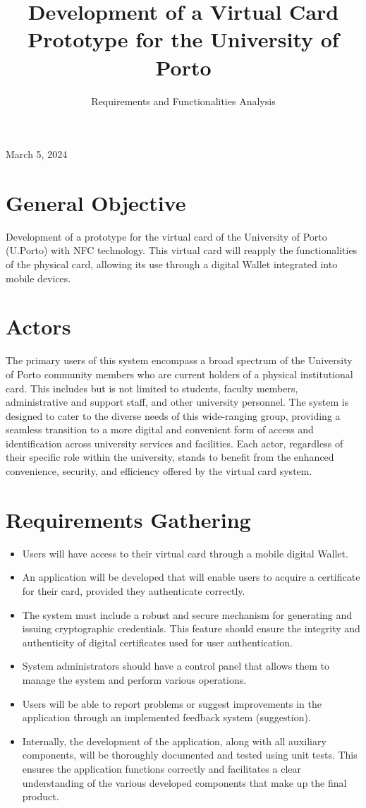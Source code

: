 \documentclass[10pt]{article}
\title{Development of a Virtual Card Prototype for the University of Porto }
\author{Requirements and Functionalities Analysis}
\date{}
\begin{document}
\maketitle
March 5, 2024

\section*{General Objective}
Development of a prototype for the virtual card of the University of Porto (U.Porto) with NFC technology. This virtual card will reapply the functionalities of the physical card, allowing its use through a digital Wallet integrated into mobile devices.

\section*{Actors}
The primary users of this system encompass a broad spectrum of the University of Porto community members who are current holders of a physical institutional card. This includes but is not limited to students, faculty members, administrative and support staff, and other university personnel. The system is designed to cater to the diverse needs of this wide-ranging group, providing a seamless transition to a more digital and convenient form of access and identification across university services and facilities. Each actor, regardless of their specific role within the university, stands to benefit from the enhanced convenience, security, and efficiency offered by the virtual card system.

\section*{Requirements Gathering}
\begin{itemize}
  \item Users will have access to their virtual card through a mobile digital Wallet.
  \item An application will be developed that will enable users to acquire a certificate for their card, provided they authenticate correctly.
  \item The system must include a robust and secure mechanism for generating and issuing cryptographic credentials. This feature should ensure the integrity and authenticity of digital certificates used for user authentication.
  \item System administrators should have a control panel that allows them to manage the system and perform various operations.
  \item Users will be able to report problems or suggest improvements in the application through an implemented feedback system (suggestion).
  \item Internally, the development of the application, along with all auxiliary components, will be thoroughly documented and tested using unit tests. This ensures the application functions correctly and facilitates a clear understanding of the various developed components that make up the final product.
\end{itemize}
\end{document}
